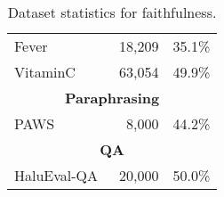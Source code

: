 \begin{table}[t]
{{\begin{tabular}{lrr}
Fever~\cite{thorne-etal-2018-fact}                                & 18,209                                   & 35.1\%                                     \\
VitaminC~\cite{schuster-etal-2021-get}                             & 63,054                                   & 49.9\%                                     \\ \midrule
\multicolumn{3}{c}{\textbf{Paraphrasing}}                                                                                    \\ \midrule   
PAWS~\cite{zhang-etal-2019-paws}                                 & 8,000                                    & 44.2\%                                     \\ \midrule
\multicolumn{3}{c}{\textbf{QA}}                                                                                              \\ \midrule   
HaluEval-QA~\cite{Li2023HaluEvalAL}                          & 20,000                                   & 50.0\%                                     \\ \bottomrule
\end{tabular}
}}
\caption{Dataset statistics for faithfulness.}
\label{tab:faithfulness_data}
\end{table}

